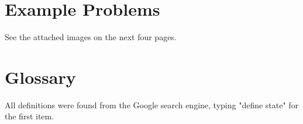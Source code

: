 \documentclass[12pt]{article}
\begin{document}
\section{Example Problems}

See the attached images on the next four pages.



\section{Glossary}

All definitions were found from the Google search engine, typing "define state" for the first item.
\end{document}
